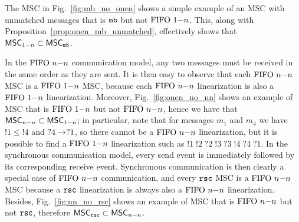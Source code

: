 The MSC in Fig.~\ref{fig:mb_no_onen} shows a simple example of an MSC with unmatched messages that is $\mathtt{mb}$ but not $\text{FIFO } 1\mathsf{-}n$. This, along with Proposition~\ref{prop:onen_mb_unmatched}, effectively shows that $\mathsf{MSC}_{1\mathsf{-}n} \subset \mathsf{MSC}_{\mathtt{mb}}$.

\medskip 

In the $\text{FIFO } n\mathsf{-}n$ communication model, any two messages must be received in the same order as they are sent. It is then easy to observe that each $\text{FIFO } n\mathsf{-}n$ MSC is a $\text{FIFO } 1\mathsf{-}n$ MSC, because each $\text{FIFO } n\mathsf{-}n$ linearization is also a $\text{FIFO } 1\mathsf{-}n$ linearization. Moreover, Fig.~\ref{fig:onen_no_nn} shows an example of MSC that is $\text{FIFO } 1\mathsf{-}n$ but not $\text{FIFO } n\mathsf{-}n$, hence we have that $\mathsf{MSC}_{n\mathsf{-}n} \subset \mathsf{MSC}_{1\mathsf{-}n}$; in particular, note that for messages $m_1$ and $m_4$ we have $!1 \le !4$ and $?4 \to ?1$, so there cannot be a $\text{FIFO } n\mathsf{-}n$ linearization, but it is possible to find a $\text{FIFO } 1\mathsf{-}n$ linearization such as $!1\;!2\;?2\;!3\;?3\;!4\;?4\;?1$. In the synchronous communication model, every send event is immediately followed by its corresponding receive event. Synchronous communication is then clearly a special case of $\text{FIFO } n\mathsf{-}n$ communication, and every $\mathtt{rsc}$ MSC is a $\text{FIFO } n\mathsf{-}n$ MSC because a $\mathtt{rsc}$ linearization is always also a $\text{FIFO } n\mathsf{-}n$ linearization. Besides, Fig.~\ref{fig:nn_no_rsc} shows an example of MSC that is $\text{FIFO } n\mathsf{-}n$ but not $\mathtt{rsc}$, therefore $\mathsf{MSC}_{\mathtt{rsc}} \subset \mathsf{MSC}_{n\mathsf{-}n}$.
